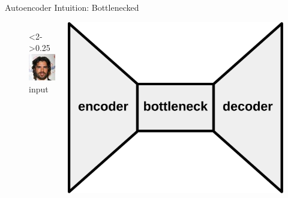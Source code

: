 \begin{frame}{Autoencoder Intuition: Bottlenecked}

\begin{figure}

  \centering

  \begin{columns}
  \begin{column}<2->{0.25\textwidth}
  \Large
  \centering
  \phantom{input}
  \includegraphics[width=\textwidth]{img/guy}\\
  input
  \end{column}
  \begin{column}{0.5\textwidth}
  \includegraphics[width=\textwidth]{img/stripped_bottleneck}

\end{column}
\end{columns}
\end{figure}
\end{frame}
